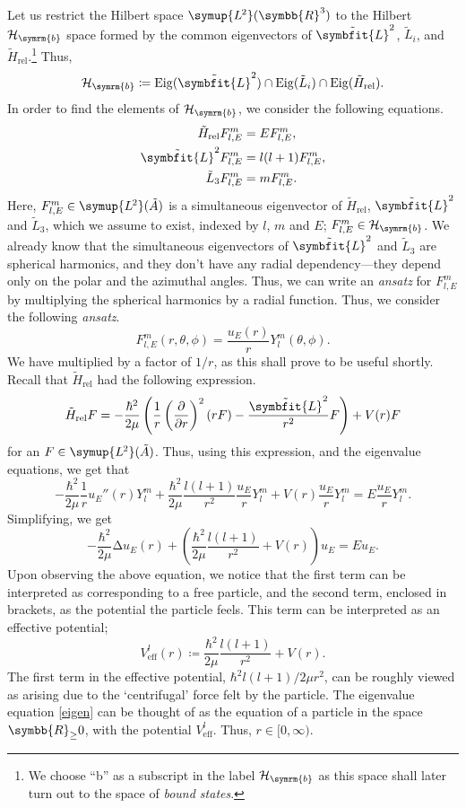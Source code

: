 \documentclass[12pt, a4 paper]{article}
\let\symcal\mathcal
\theoremstyle{definition}
\newcommand{\ltwo}{\symup{L\kern-0.5pt^2}}
\newcommand{\ltworthree}{\ltwo(\rr^3)}
\newcommand{\rr}{\symbb{R}}
\newcommand{\hilbert}{\symcal{H}}
\newcommand{\lap}{∆}
\newcommand{\lvecsquare}{\tilde{\symbfit{L}}^2}
\newcommand{\hrel}{\tilde{H}_\text{rel}}
\newcommand{\lthree}{\tilde{L}_3}
\newcommand{\flme}{F^m_{l,E}}
\newcommand{\bhilbert}{\hilbert_{\symrm{b}}}
\newcommand{\eigen}{\operatorname{Eig}}
\newcommand{\ltwoa}{\ltwo(\tilde{A})}
\newcommand{\sphe}{Y_l^m}
\begin{document}
    Let us restrict the Hilbert space \(\ltworthree\) to the Hilbert \(\bhilbert\) space formed by the common eigenvectors of \(\lvecsquare\), \(\tilde{L}_i\), and \(\hrel\).\footnote{We choose ``b'' as a subscript in the label \(\bhilbert\) as this space shall later turn out to the space of \textit{bound states}.} Thus,
    \[
        \bhilbert \coloneq \eigen(\lvecsquare) \cap \eigen(\tilde{L}_i) \cap \eigen(\hrel).
    \]
    In order to find the elements of \(\bhilbert\), we consider the following equations.
    \begin{align*}
        \hrel \flme &= E \flme,\\
        \lvecsquare \flme &= l(l+1) \flme,\\
        \lthree \flme &= m \flme.
    \end{align*}
    Here, \(\flme \in \ltwoa\) is a simultaneous eigenvector of \(\hrel\), \(\lvecsquare\) and \(\lthree\), which we assume to exist, indexed by \(l\), \(m\) and \(E\); \(\flme \in \bhilbert\). We already know that the simultaneous eigenvectors of \(\lvecsquare\) and \(\lthree\) are spherical harmonics, and they don't have any radial dependency---they depend only on the polar and the azimuthal angles. Thus, we can write an \textit{ansatz} for \(\flme\) by multiplying the spherical harmonics by a radial function. Thus, we consider the following \textit{ansatz}.
    \[
        \flme(r, \theta, \phi) = \frac{u_E(r)}{r}\sphe(\theta, \phi).
    \]
    We have multiplied by a factor of \(1/r\), as this shall prove to be useful shortly. Recall that \(\hrel\) had the following expression.
    \[
        \tilde{H}_\text{rel} F = -\frac{\hbar^2}{2\mu}\left(\frac{1}{r}\left(\frac{\partial}{\partial r}\right)^2 (rF) - \frac{\lvecsquare}{r^2}F\right) + V(r)F
    \]
    for an \(F \in \ltwoa\). Thus, using this expression, and the eigenvalue equations, we get that
    \[
        -\frac{\hbar^2}{2\mu} \frac{1}{r} u_E''(r) \sphe + \frac{\hbar^2}{2\mu} \frac{l(l+1)}{r^2} \frac{u_E}{r} \sphe + V(r) \frac{u_E}{r} \sphe = E \frac{u_E}{r} \sphe.
    \]
    Simplifying, we get
    \[
        -\frac{\hbar^2}{2\mu} \lap u_E(r) + \left(\frac{\hbar^2}{2\mu} \frac{l(l+1)}{r^2} + V(r)\right) u_E = E u_E.\tag{\textasteriskcentered}\label{eigen}
    \]
    Upon observing the above equation, we notice that the first term can be interpreted as corresponding to a free particle, and the second term, enclosed in brackets, as the potential the particle feels. This term can be interpreted as an effective potential;
    \[
        V^l_{\text{eff}} (r) \coloneq \frac{\hbar^2}{2\mu} \frac{l(l+1)}{r^2} + V(r).
    \]
    The first term in the effective potential, \(\hbar^2 l(l+1)/2\mu r^2\), can be roughly viewed as arising due to the `centrifugal' force felt by the particle. The eigenvalue equation \eqref{eigen} can be thought of as the equation of a particle in the space \(\rr_{\geq}0\), with the potential \(V^l_{\text{eff}}\). Thus, \(r \in [0, \infty)\).
\end{document}

